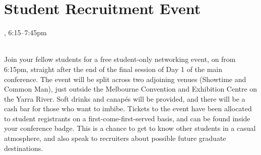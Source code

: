 \clearpage
\section{Student Recruitment Event}
\setheaders{}{\daydateyear}

\begin{center}



\daydateyear, 6:15--7:45pm \vspace{1em}\\
\StudentLunchLoc \\
\end{center}

Join your fellow students for a free student-only networking event, on
\daydate from 6:15pm, straight after the end of the final session of Day
1 of the main conference. The event will be split across two adjoining
venues (Showtime and Common Man), just outside the Melbourne Convention
and Exhibition Centre on the Yarra River.  Soft drinks and canap\'es
will be provided, and there will be a cash bar for those who want to
imbibe. Tickets to the event have been allocated to student registrants
on a first-come-first-served basis, and can be found inside your
conference badge. This is a chance to get to know other students in a
casual atmosphere, and also speak to recruiters about possible future
graduate destinations.
